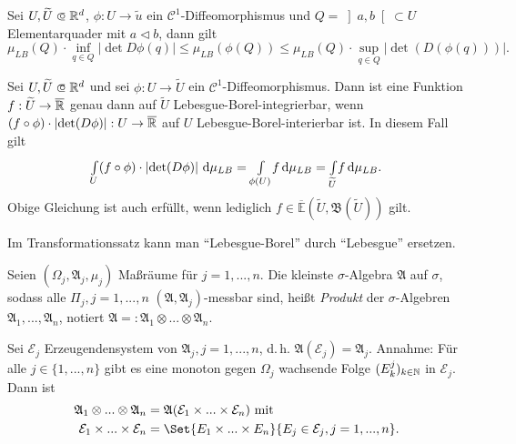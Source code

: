 \documentclass{cheat-sheet}
\newcommand{\Alg}{\mathfrak{A}} %
\newcommand{\Bor}{\mathfrak{B}} %
\newcommand{\E}{\mathbb{E}} %
\begin{document}
\begin{satz}
  Sei $U, \widetilde{U} \opn \R^d$, $\phi : U \to \widetilde{u}$ ein $\mathcal{C}^1$-Diffeomorphismus und $Q = \left]a, b\right[ \subset U$ Elementarquader mit $a \lhd b$, dann gilt
  \[ \mu_{LB}(Q) \cdot \inf_{q \in Q} \left|\det D \phi(q)\right| \leq \mu_{LB}(\phi(Q)) \leq \mu_{LB}(Q) \cdot \sup_{q \in Q} \left|\det(D(\phi(q)))\right|. \]
\end{satz}

\begin{satz}[Transformationssatz]
  Sei $U, \widetilde{U} \opn \R^d$ und sei $\phi : U \to \widetilde{U}$ ein $\mathcal{C}^1$-Diffeomorphismus. Dann ist eine Funktion $f : \widetilde{U} \to \overline{\mathbb{R}}$ genau dann auf $\widetilde{U}$ Lebesgue-Borel-integrierbar, wenn $(f \circ \phi) \cdot \left|\det(D\phi)\right| : U \to \overline{\mathbb{R}}$ auf $U$ Lebesgue-Borel-interierbar ist. In diesem Fall gilt
  \[ {\textstyle \int\limits_{U}^{}} (f \circ \phi) \cdot \left|\det(D\phi)\right| \,\mathrm{d} \mu_{LB} = {\textstyle \int\limits_{\phi(U)}^{}} f \,\mathrm{d} \mu_{LB} = {\textstyle \int\limits_{\widetilde{U}}^{}} f \,\mathrm{d} \mu_{LB}. \]
  Obige Gleichung ist auch erfüllt, wenn lediglich $f \in \overline{\E}(\widetilde{U}, \Bor(\widetilde{U}))$ gilt.
\end{satz}

\begin{bem}
  Im Transformationssatz kann man "`Lebesgue-Borel"' durch "`Lebesgue"' ersetzen.
\end{bem}



% 

\begin{defn}
  Seien $(\Omega_j, \Alg_j, \mu_j)$ Maßräume für $j = 1, ..., n$. Die kleinste $\sigma$-Algebra $\Alg$ auf $\sigma$, sodass alle $\Pi_j, j = 1, ..., n$ $(\Alg, \Alg_j)$-messbar sind, heißt \emph{Produkt} der $\sigma$-Algebren $\Alg_1, ..., \Alg_n$, notiert $\Alg =: \Alg_1 \otimes ... \otimes \Alg_n$.
\end{defn}

\begin{satz}
  Sei $\mathcal{E}_j$ Erzeugendensystem von $\Alg_j, j = 1, ..., n$, d.\,h. $\Alg(\mathcal{E}_j) = \Alg_j$. Annahme: Für alle $j \in \{ 1, ..., n \}$ gibt es eine monoton gegen $\Omega_j$ wachsende Folge $(E^j_k)_{k \in \mathbb{N}}$ in $\mathcal{E}_j$. Dann ist
  \begin{align*}
    \Alg_1 \otimes ... \otimes \Alg_n &= \Alg(\mathcal{E}_1 \times ... \times \mathcal{E}_n) \text{ mit }\\
    \mathcal{E}_1 \times ... \times \mathcal{E}_n &= \Set{ E_1 \times ... \times E_n }{ E_j \in \mathcal{E}_j, j = 1, ..., n }.
  \end{align*}
\end{satz}
\end{document}
